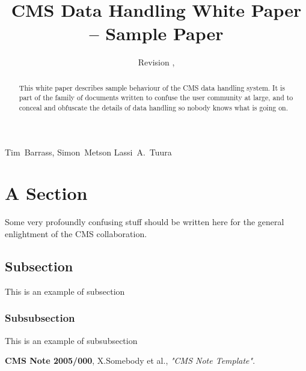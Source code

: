 \documentclass{cmspaper}
\begin{document}
\begin{titlepage}
  \whitepaper %
  \date{Revision \RCSRevision, \RCSDate}
  \title{CMS Data Handling White Paper -- Sample Paper}

  \begin{Authlist}
    Tim~Barrass, Simon~Metson
    Lassi~A.~Tuura
  \end{Authlist}


  \begin{abstract}
    This white paper describes sample behaviour of the CMS data handling
    system.  It is part of the family of documents written to confuse the
    user community at large, and to conceal and obfuscate the details of
    data handling so nobody knows what is going on.
  \end{abstract} 

\end{titlepage}

\setcounter{page}{2}

\section{A Section}
Some very profoundly confusing stuff should be written here for the general
enlightment of the CMS collaboration.

\subsection{Subsection}
This is an example of subsection

\subsubsection{Subsubsection}
This is an example of subsubsection

\begin{thebibliography}{9}
   {\bf CMS Note 2005/000},
    X.Somebody et al.,
    {\em "CMS Note Template"}.
\end{thebibliography}
 
\end{document}
